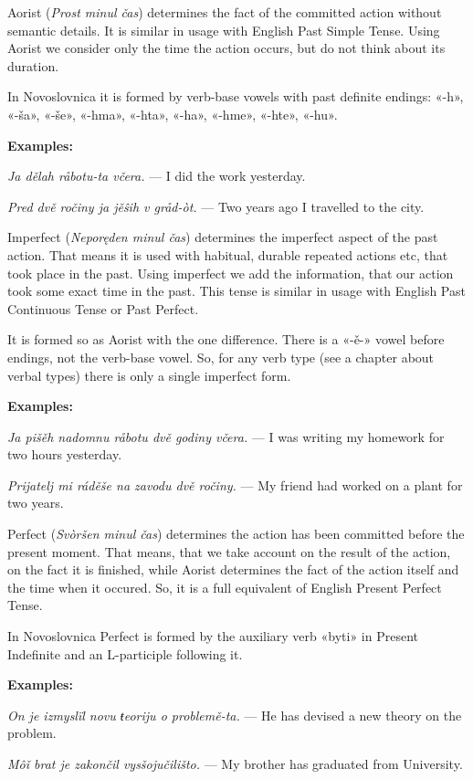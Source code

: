 Aorist (\textit{Prost minul čas}) determines the fact of the committed action without semantic details. It is similar in usage with English Past Simple Tense. Using Aorist we consider only the time the action occurs, but do not think about its duration.

In Novoslovnica it is formed by verb-base vowels with past definite endings: «-h», «-ša», «-še», «-hma», «-hta», «-ha», «-hme», «-hte», «-hu».

\textbf{Examples:}

\textit{Ja dělah råbotu-ta včera.} — I did the work yesterday.

\textit{Pred dvě ročiny ja jěŝih v gråd-òt.} — Two years ago I travelled to the city.

Imperfect (\textit{Neporęden minul čas}) determines the imperfect aspect of the past action. That means it is used with habitual, durable repeated actions etc, that took place in the past. Using imperfect we add the information, that our action took some exact time in the past. This tense is similar in usage with English Past Continuous Tense or Past Perfect.

It is formed so as Aorist with the one difference. There is a «-ě-» vowel before endings, not the verb-base vowel. So, for any verb type (see a chapter about verbal types) there is only a single imperfect form.

\textbf{Examples:}

\textit{Ja pišěh nadomnu råbotu dvě godiny včera.} — I was writing my homework for two hours yesterday.

\textit{Prijatelj mi ráděše na zavodu dvě ročiny.} — My friend had worked on a plant for two years.

Perfect (\textit{Svòršen minul čas}) determines the action has been committed before the present moment. That means, that we take account on the result of the action, on the fact it is finished, while Aorist determines the fact of the action itself and the time when it occured. So, it is a full equivalent of English Present Perfect Tense.

In Novoslovnica Perfect is formed by the auxiliary verb «byti» in Present Indefinite and an L-participle following it.

\textbf{Examples:}

\textit{On je izmyslïl novu ŧeoriju o problemě-ta.} — He has devised a new theory on the problem.

\textit{Môǐ brat je zakončil vysšojučilišto.} — My brother has graduated from University.

